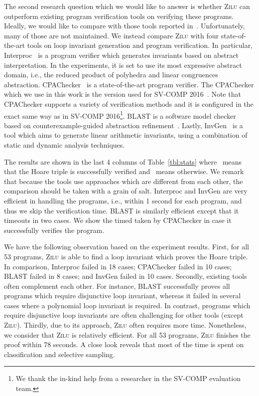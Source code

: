 The second research question which we would like to answer is whether \textsc{Zilu} can outperform existing program verification tools on verifying these programs. Ideally, we would like to compare with those tools reported in~\cite{sharma2012interpolants,sharma2013verification,DBLP:conf/esop/0001GHALN13,sharma2014invariant}. Unfortunately, many of those are not maintained. We instead compare \textsc{Zilu} with four state-of-the-art tools on loop invariant generation and program verification. In particular, Interproc~\cite{jeannet2010interproc} is a program verifier which generates invariants based on abstract interpretation. In the experiments, it is set to use its most expressive abstract domain, i.e., the reduced product of polyhedra and linear congruences abstraction. CPAChecker~\cite{DBLP:conf/cav/BeyerK11} is a state-of-the-art program verifier. The CPAChecker which we use in this work is the version used for SV-COMP 2016~\cite{Dirk:SVCOMP:2016}. Note that CPAChecker supports a variety of verification methods and it is configured in the exact same way as in SV-COMP 2016\footnote{We thank the in-kind help from a researcher in the SV-COMP evaluation team.}. BLAST is a software model checker based on counterexample-guided abstraction refinement~\cite{DBLP:journals/sttt/BeyerHJM07}. Lastly, InvGen~\cite{ashutosh2009invgen} is a tool which aims to generate linear arithmetic invariants, using a combination of static and dynamic analysis techniques. 

The results are shown in the last 4 columns of Table~\ref{tbl:stats} where \cmark~means that the Hoare triple is successfully verified and \xmark~means otherwise. We remark that because the tools use approaches which are different from each other, the comparison should be taken with a grain of salt. Interproc and InvGen are very efficient in handling the programs, i.e., within 1 second for each program, and thus we skip the verification time. BLAST is similarly efficient except that it timeouts in two cases. We show the timed taken by CPAChecker in case it successfully verifies the program. 

We have the following observation based on the experiment results. First, for all 53 programs, \textsc{Zilu} is able to find a loop invariant which proves the Hoare triple. In comparison, Interproc failed in 18 cases; CPAChecker failed in 10 cases; BLAST failed in 8 cases; and InvGen failed in 10 cases. Secondly, existing tools often complement each other. For instance, BLAST successfully proves all programs which require disjunctive loop invariant, whereas it failed in several cases where a polynomial loop invariant is required. In contrast, programs which require disjunctive loop invariants are often challenging for other tools (except \textsc{Zilu}). Thirdly, due to its approach, \textsc{Zilu} often requires more time. Nonetheless, we consider that \textsc{Zilu} is relatively efficient. For all 53 programs, \textsc{Zilu} finishes the proof within 78 seconds. A close look reveals that most of the time is spent on classification and selective sampling. %
